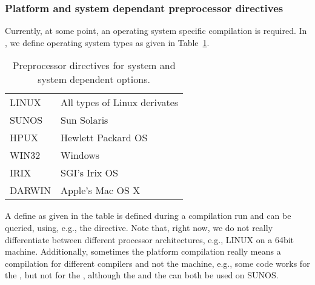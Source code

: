\subsubsection{Platform and system dependant preprocessor directives}
Currently, at some point, an operating system specific compilation is required.
In , we define operating system types as given in Table~\ref{tab:OSTYPES}.
\begin{table}
	\centering
		\begin{tabular}{l p{7cm}}
		LINUX & All types of Linux derivates \\
		SUNOS & Sun Solaris \\
		HPUX & Hewlett Packard OS \\
		WIN32 & Windows \\
		IRIX & SGI's Irix OS \\	
		DARWIN & Apple's Mac OS X \\	
		\end{tabular}
		\caption{\label{tab:OSTYPES}Preprocessor directives for system and system dependent options.}
\end{table}
A define as given in the table is defined during a compilation run and can be queried, using, e.g., the  directive.
Note that, right now, we do not really differentiate between different processor architectures, e.g., LINUX on a 64bit machine.
Additionally, sometimes the platform compilation really means a compilation for different compilers and not the machine, e.g., some code works for the , but not for the , although the  and the  can both be used on SUNOS.

